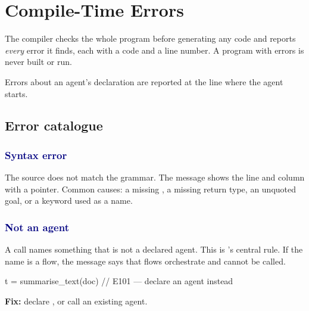 \chapter{Compile-Time Errors}
\label{ch:errors}

The compiler checks the whole program before generating any code and reports \emph{every} error it finds, each with a code and a line number. A program with errors is never built or run.


Errors about an agent's declaration are reported at the line where the agent starts.

\newcommand{\errhead}[2]{\subsection*{\errcode{#1}\enspace\textcolor{navy}{#2}}}

\section{Error catalogue}

\errhead{E100}{Syntax error}
The source does not match the grammar. The message shows the line and column with a pointer. Common causes: a missing \code{\}}, a missing \code{->} return type, an unquoted goal, or a keyword used as a name.

\errhead{E101}{Not an agent}
A call names something that is not a declared agent. This is \algolang's central rule. If the name is a flow, the message says that flows orchestrate and cannot be called.
\begin{algo}
t = summarise_text(doc)   // E101 — declare an agent instead
\end{algo}
\textbf{Fix:} declare , or call an existing agent.

